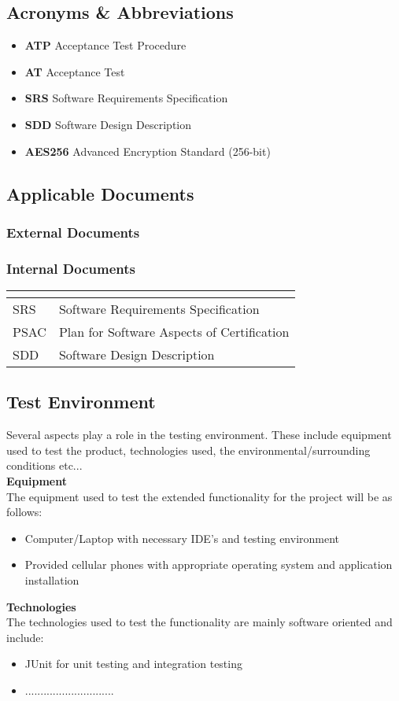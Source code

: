 \documentclass[11pt]{article}
\begin{document}
\subsection{Acronyms \& Abbreviations}
\begin{itemize}
\item \textbf{ATP} Acceptance Test Procedure
\item \textbf{AT} Acceptance Test
\item \textbf{SRS} Software Requirements Specification
\item \textbf{SDD} Software Design Description
\item \textbf{AES256} Advanced Encryption Standard (256-bit)
\end{itemize}
\subsection{Applicable Documents}
\subsubsection{External Documents}
\subsubsection{Internal Documents}
\begin{tabular}{ll}
\textbf{}       & \textbf{}  \\ \hline
\multicolumn{1}{|L{2cm}|}{SRS} & \multicolumn{1}{L{10cm}|}{Software Requirements Specification} \\ \hline
\multicolumn{1}{|L{2cm}|}{PSAC} & \multicolumn{1}{L{10cm}|}{Plan for Software Aspects of Certification} \\ \hline
\multicolumn{1}{|L{2cm}|}{SDD} & \multicolumn{1}{L{10cm}|}{Software Design Description} \\ \hline
\end{tabular}

\subsection{Test Environment}
Several aspects play a role in the testing environment. These include equipment used to test the product, technologies used, the environmental/surrounding conditions etc...\\
\textbf{Equipment}\\
The equipment used to test the extended functionality for the project will be as follows:
\begin{itemize}
\item Computer/Laptop with necessary IDE's and testing environment
\item Provided cellular phones with appropriate operating system and application installation
\end{itemize}
\textbf{Technologies}\\
The technologies used to test the functionality are mainly software oriented and include:
\begin{itemize}
\item JUnit for unit testing and integration testing
\item .............................
\end{itemize}
\end{document}

